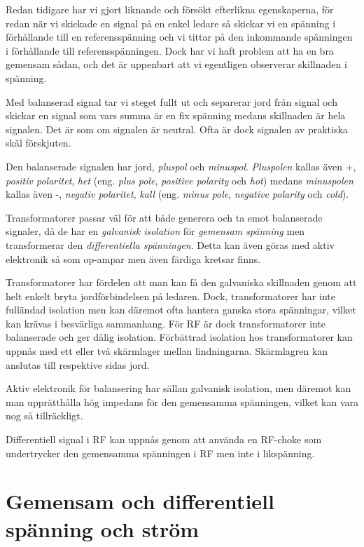 Redan tidigare har vi gjort liknande och försökt efterlikna
egenskaperna, för redan när vi skickade en signal på en enkel ledare så skickar
vi en spänning i förhållande till en referensspänning och vi tittar på den
inkommande spänningen i förhållande till referensspänningen. Dock har vi haft
problem att ha en bra gemensam sådan, och det är uppenbart att vi egentligen
observerar skillnaden i spänning.

Med balanserad signal tar vi steget fullt ut och separerar jord från signal
och skickar en signal som vars summa är en fix spänning medans skillnaden är
hela signalen. Det är som om signalen är neutral. Ofta är dock signalen av
praktiska skäl förskjuten.

Den balanserade signalen har jord, \emph{pluspol} och \emph{minuspol}.
\emph{Pluspolen} kallas även +, \emph{positiv polaritet}, \emph{het} (eng.
\emph{plus pole}, \emph{positive polarity} och \emph{hot}) medans
\emph{minuspolen} kallas även -, \emph{negativ polaritet}, \emph{kall} (eng.
\emph{minus pole}, \emph{negative polarity} och \emph{cold}).

Transformatorer passar väl för att både generera och ta emot balanserade
signaler, då de har en \emph{galvanisk isolation} för \emph{gemensam spänning}
men transformerar den \emph{differentiella spänningen}. Detta kan även göras med
aktiv elektronik så som op-ampar men även färdiga kretsar finns.

Transformatorer har fördelen att man kan få den galvaniska skillnaden genom
att helt enkelt bryta jordförbindelsen på ledaren. Dock, transformatorer har
inte fulländad isolation men kan däremot ofta hantera ganska stora spänningar,
vilket kan krävas i besvärliga sammanhang. För RF är dock transformatorer inte
balanserade och ger dålig isolation. Förbättrad isolation hos transformatorer
kan uppnås med ett eller två skärmlager mellan lindningarna. Skärmlagren kan
anslutas till respektive sidas jord.

Aktiv elektronik för balansering har sällan galvanisk isolation, men däremot
kan man upprätthålla hög impedans för den gemensamma spänningen, vilket kan
vara nog så tillräckligt.

Differentiell signal i RF kan uppnås genom att använda en RF-choke som
undertrycker den gemensamma spänningen i RF men inte i likspänning.

\section{Gemensam och differentiell spänning och ström}

